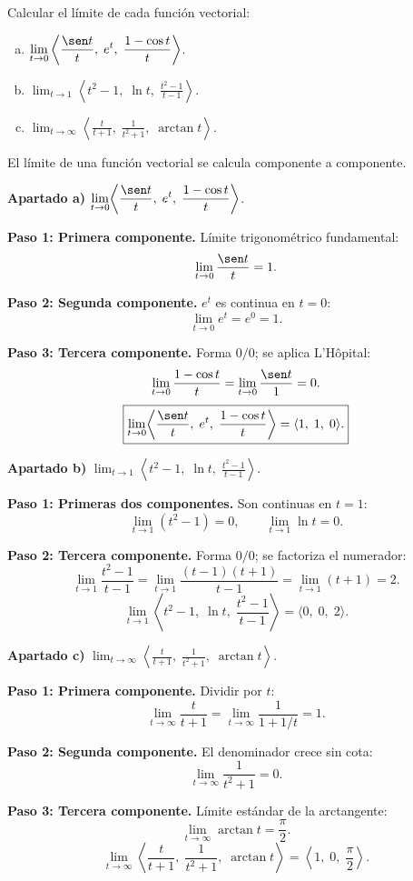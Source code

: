 \begin{prob}
Calcular el límite de cada función vectorial:
\begin{enumerate}[a)]
  \item $\displaystyle \lim_{t \to 0} \left\langle \frac{\sen t}{t},\; e^t,\; \frac{1-\cos t}{t} \right\rangle$.
  \item $\displaystyle \lim_{t \to 1} \left\langle t^2-1,\; \ln t,\; \frac{t^2-1}{t-1} \right\rangle$.
  \item $\displaystyle \lim_{t \to \infty} \left\langle \frac{t}{t+1},\; \frac{1}{t^2+1},\; \arctan t \right\rangle$.
\end{enumerate}
\begin{myproof}
El límite de una función vectorial se calcula componente a componente.

\textbf{Apartado a)} $\displaystyle\lim_{t\to 0}\!\left\langle\frac{\sen t}{t},\;e^t,\;\frac{1-\cos t}{t}\right\rangle$.

\textbf{Paso 1: Primera componente.} Límite trigonométrico fundamental:
\[
  \lim_{t\to 0}\frac{\sen t}{t} = 1.
\]

\textbf{Paso 2: Segunda componente.} $e^t$ es continua en $t=0$:
\[
  \lim_{t\to 0}e^t = e^0 = 1.
\]

\textbf{Paso 3: Tercera componente.} Forma $0/0$; se aplica L'Hôpital:
\[
  \lim_{t\to 0}\frac{1-\cos t}{t} = \lim_{t\to 0}\frac{\sen t}{1} = 0.
\]
\[
  \boxed{\lim_{t\to 0}\!\left\langle\frac{\sen t}{t},\;e^t,\;\frac{1-\cos t}{t}\right\rangle = \langle 1,\;1,\;0\rangle.}
\]

\textbf{Apartado b)} $\displaystyle\lim_{t\to 1}\!\left\langle t^2-1,\;\ln t,\;\frac{t^2-1}{t-1}\right\rangle$.

\textbf{Paso 1: Primeras dos componentes.} Son continuas en $t=1$:
\[
  \lim_{t\to 1}(t^2-1)=0,\qquad \lim_{t\to 1}\ln t = 0.
\]

\textbf{Paso 2: Tercera componente.} Forma $0/0$; se factoriza el numerador:
\[
  \lim_{t\to 1}\frac{t^2-1}{t-1}=\lim_{t\to 1}\frac{(t-1)(t+1)}{t-1}=\lim_{t\to 1}(t+1)=2.
\]
\[
  \boxed{\lim_{t\to 1}\!\left\langle t^2-1,\;\ln t,\;\frac{t^2-1}{t-1}\right\rangle = \langle 0,\;0,\;2\rangle.}
\]

\textbf{Apartado c)} $\displaystyle\lim_{t\to\infty}\!\left\langle\frac{t}{t+1},\;\frac{1}{t^2+1},\;\arctan t\right\rangle$.

\textbf{Paso 1: Primera componente.} Dividir por $t$:
\[
  \lim_{t\to\infty}\frac{t}{t+1}=\lim_{t\to\infty}\frac{1}{1+1/t}=1.
\]

\textbf{Paso 2: Segunda componente.} El denominador crece sin cota:
\[
  \lim_{t\to\infty}\frac{1}{t^2+1}=0.
\]

\textbf{Paso 3: Tercera componente.} Límite estándar de la arctangente:
\[
  \lim_{t\to\infty}\arctan t = \frac{\pi}{2}.
\]
\[
  \boxed{\lim_{t\to\infty}\!\left\langle\frac{t}{t+1},\;\frac{1}{t^2+1},\;\arctan t\right\rangle = \left\langle 1,\;0,\;\frac{\pi}{2}\right\rangle.}
\]
\end{myproof}
\end{prob}

